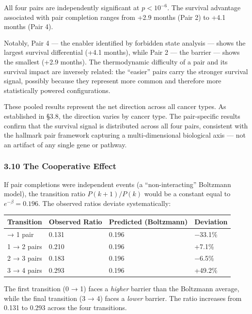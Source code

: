 \documentclass[
  11pt,
]{article}
\newcounter{none} %
\begin{document}
\normalsize

All four pairs are independently significant at \(p < 10^{-6}\). The
survival advantage associated with pair completion ranges from +2.9
months (Pair 2) to +4.1 months (Pair 4).

Notably, Pair 4 --- the enabler identified by forbidden state analysis
--- shows the largest survival differential (+4.1 months), while Pair 2
--- the barrier --- shows the smallest (+2.9 months). The thermodynamic
difficulty of a pair and its survival impact are inversely related: the
``easier'' pairs carry the stronger survival signal, possibly because
they represent more common and therefore more statistically powered
configurations.

These pooled results represent the net direction across all cancer
types. As established in §3.8, the direction varies by cancer type. The
pair-specific results confirm that the survival signal is distributed
across all four pairs, consistent with the hallmark pair framework
capturing a multi-dimensional biological axis --- not an artifact of any
single gene or pathway.

\subsubsection{3.10 The Cooperative
Effect}\label{the-cooperative-effect}

If pair completions were independent events (a ``non-interacting''
Boltzmann model), the transition ratio \(P(k{+}1)/P(k)\) would be a
constant equal to \(e^{-\beta} = 0.196\). The observed ratios deviate
systematically:

{\def\LTcaptype{none} %
\begin{longtable}[]{@{}llll@{}}
\toprule\noalign{}
Transition & Observed Ratio & Predicted (Boltzmann) & Deviation \\
\midrule\noalign{}
\endhead
\bottomrule\noalign{}
\endlastfoot
0 → 1 pair & 0.131 & 0.196 & −33.1\% \\
1 → 2 pairs & 0.210 & 0.196 & +7.1\% \\
2 → 3 pairs & 0.183 & 0.196 & −6.5\% \\
3 → 4 pairs & 0.293 & 0.196 & +49.2\% \\
\end{longtable}
}

The first transition (0 → 1) faces a \emph{higher} barrier than the
Boltzmann average, while the final transition (3 → 4) faces a
\emph{lower} barrier. The ratio increases from 0.131 to 0.293 across the
four transitions.
\end{document}
